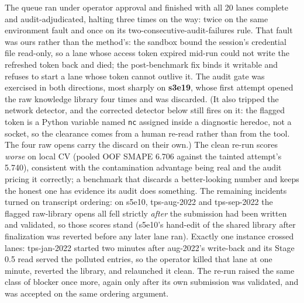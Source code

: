 \documentclass[11pt,a4paper]{article}
\begin{document}
The queue ran under operator approval and finished with all 20 lanes complete and audit-adjudicated, halting three times on the way: twice on the same environment fault and once on its two-consecutive-audit-failures rule. That fault was ours rather than the method's: the sandbox bound the session's credential file read-only, so a lane whose access token expired mid-run could not write the refreshed token back and died; the post-benchmark fix binds it writable and refuses to start a lane whose token cannot outlive it. The audit gate was exercised in both directions, most sharply on \textbf{s3e19}, whose first attempt opened the raw knowledge library four times and was discarded. (It also tripped the network detector, and the corrected detector below still fires on it: the flagged token is a Python variable named \texttt{nc} assigned inside a diagnostic heredoc, not a socket, so the clearance comes from a human re-read rather than from the tool. The four raw opens carry the discard on their own.) The clean re-run scores \emph{worse} on local CV (pooled OOF SMAPE 6.706 against the tainted attempt's 5.740), consistent with the contamination advantage being real and the audit pricing it correctly; a benchmark that discards a better-looking number and keeps the honest one has evidence its audit does something. The remaining incidents turned on transcript ordering: on s5e10, tps-aug-2022 and tps-sep-2022 the flagged raw-library opens all fell strictly \emph{after} the submission had been written and validated, so those scores stand (s5e10's hand-edit of the shared library after finalization was reverted before any later lane ran). Exactly one instance crossed lanes: tps-jan-2022 started two minutes after aug-2022's write-back and its Stage 0.5 read served the polluted entries, so the operator killed that lane at one minute, reverted the library, and relaunched it clean. The re-run raised the same class of blocker once more, again only after its own submission was validated, and was accepted on the same ordering argument.
\end{document}
